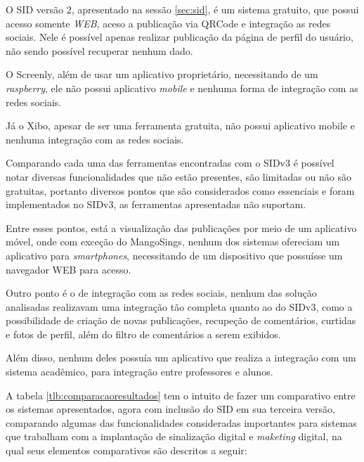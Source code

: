 O SID versão 2, apresentado na sessão \ref{sec:sid}, é um sistema gratuito, que possui acesso somente \textit{WEB}, aceso a publicação via QRCode e integração as redes sociais. Nele é possível apenas realizar publicação da página de perfil do usuário, não sendo possível recuperar nenhum dado.

O Screenly, além de usar um aplicativo proprietário, necessitando de um \textit{raspberry}, ele não possui aplicativo \textit{mobile} e nenhuma forma de integração com as redes sociais.

Já o Xibo, apesar de ser uma ferramenta gratuita, não possui aplicativo mobile e nenhuma integração com as redes sociais. 

Comparando cada uma das ferramentas encontradas com o SIDv3 é possível notar diversas funcionalidades que não estão presentes, são limitadas ou não são gratuitas, portanto diversos pontos que são considerados como essenciais e foram implementados no SIDv3, as ferramentas apresentadas não suportam.

Entre esses pontos, está a visualização das publicações por meio de um aplicativo móvel, onde com exceção do MangoSings, nenhum dos sistemas ofereciam um aplicativo para \textit{smartphones}, necessitando de um dispositivo que possuísse um navegador WEB para acesso.

Outro ponto é o de integração com as redes sociais, nenhum das solução analisadas realizavam uma integração tão completa quanto ao do SIDv3, como a possibilidade de criação de novas publicações, recupeção de comentários, curtidas e fotos de perfil, além do filtro de comentários a serem exibidos. 

Além disso, nenhum deles possuía um aplicativo que realiza a integração com um sistema acadêmico, para integração entre professores e alunos.

A tabela \ref{tlb:comparacaoresultados} tem o intuito de fazer um comparativo entre os sistemas apresentados, agora com inclusão do SID em sua terceira versão, comparando algumas das funcionalidades consideradas importantes para sistemas que trabalham com a implantação de sinalização digital e \textit{maketing} digital, na qual seus elementos comparativos são descritos a seguir:

